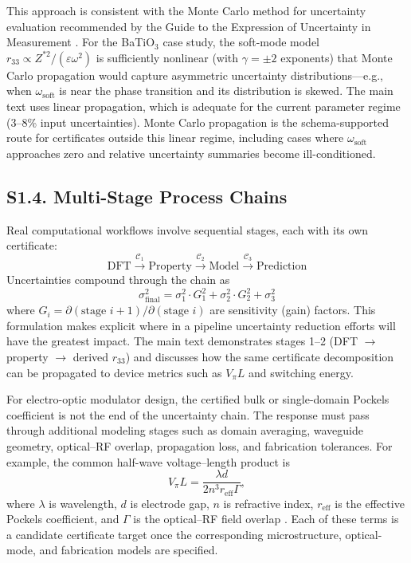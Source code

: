 \documentclass[onecolumn,superscriptaddress,amsmath,amssymb,longbibliography]{revtex4-2}
\newcommand{\cert}[1][]{\mathcal{C}_{#1}}
\begin{document}
This approach is consistent with the Monte Carlo method for uncertainty
evaluation recommended by the Guide to the Expression of Uncertainty in
Measurement \cite{JCGM2008_GUM,JCGM2008_MC,Possolo2015}. For the
BaTiO$_3$ case study, the soft-mode model $r_{33} \propto
Z^{*2}/(\varepsilon \omega^2)$ is sufficiently nonlinear (with $\gamma =
\pm 2$ exponents) that Monte Carlo propagation would capture asymmetric
uncertainty distributions---e.g., when $\omega_{\mathrm{soft}}$ is near the
phase transition and its distribution is skewed. The main text uses linear
propagation, which is adequate for the current parameter regime (3--8\%
input uncertainties). Monte Carlo propagation is the schema-supported route
for certificates outside this linear regime, including cases where
$\omega_{\mathrm{soft}}$ approaches zero and relative uncertainty summaries
become ill-conditioned.


\subsection{S1.4. Multi-Stage Process Chains}
\label{sec:si_chains}

Real computational workflows involve sequential stages, each with its own
certificate:
\begin{equation}
    \boxed{\text{DFT}} \xrightarrow{\cert[1]}
    \boxed{\text{Property}} \xrightarrow{\cert[2]}
    \boxed{\text{Model}} \xrightarrow{\cert[3]}
    \boxed{\text{Prediction}}
\end{equation}
Uncertainties compound through the chain as
\begin{equation}
    \sigma_{\mathrm{final}}^2 = \sigma_1^2 \cdot G_1^2 + \sigma_2^2 \cdot G_2^2 +
    \sigma_3^2
\end{equation}
where $G_i = \partial(\text{stage } i+1)/\partial(\text{stage } i)$ are
sensitivity (gain) factors. This formulation makes explicit where in a pipeline
uncertainty reduction efforts will have the greatest impact. The main text
demonstrates stages 1--2 (DFT $\to$ property $\to$ derived $r_{33}$) and
discusses how the same certificate decomposition can be propagated to device
metrics such as $V_\pi L$ and switching energy.

For electro-optic modulator design, the certified bulk or single-domain
Pockels coefficient is not the end of the uncertainty chain. The response must
pass through additional modeling stages such as domain averaging, waveguide
geometry, optical--RF overlap, propagation loss, and fabrication tolerances.
For example, the common half-wave voltage--length product is
\begin{equation}
    V_\pi L = \frac{\lambda d}{2 n^3 r_{\mathrm{eff}} \Gamma},
    \label{eq:si_VpiL}
\end{equation}
where $\lambda$ is wavelength, $d$ is electrode gap, $n$ is refractive index,
$r_{\mathrm{eff}}$ is the effective Pockels coefficient, and $\Gamma$ is the
optical--RF field overlap \cite{Wooten2000,Reed2010,Wang2018_LN_thin}. Each of
these terms is a candidate certificate target once the corresponding
microstructure, optical-mode, and fabrication models are specified.
\end{document}
